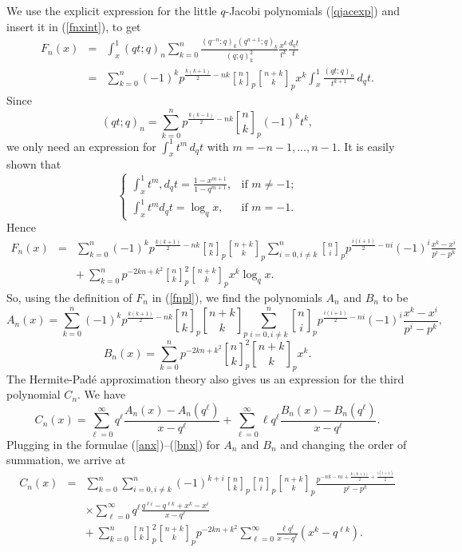 \documentclass[12pt]{article}
\def \qbinom#1#2{\genfrac{[}{]}{0pt}{}{#1}{#2}}
\numberwithin{equation}{section}
\begin{document}
We use the explicit expression for the little $q$-Jacobi
polynomials (\ref{qjacexp}) and insert it in (\ref{fnxint}), to
get
\begin{eqnarray}
 \nonumber F_n(x) &=& \int_x^1(qt;q)_n
  \sum_{k=0}^n\frac{(q^{-n};q)_k(q^{n+1};q)_k}{(q;q)_k^2}\frac{x^k}{t^k}\frac{d_{q}t}{t} \\
  \nonumber &=& \sum_{k=0}^n (-1)^kp^{\frac{k(k+1)}{2}-nk}
  \qbinom{n}{k}_{p}\qbinom{n+k}{k}_{p} x^k \int_x^1  \frac{(qt;q)_n}{t^{k+1}}\,d_{q}t.
\end{eqnarray}
Since
\[ (qt;q)_n=\sum_{k=0}^np^{\frac{k(k-1)}{2}-nk}\qbinom{n}{k}_{p}(-1)^k t^k,\]
we only need an expression for
$\int_x^1t^m\, d_{q}t$ with $m=-n-1,...,n-1$.
It is easily shown that
\[  \begin{cases}
   \displaystyle \int_x^1t^m,d_qt=\frac{1-x^{m+1}}{1-q^{m+1}}, & \textrm{if $m\neq-1$;} \\[12pt]
  \displaystyle  \int_x^1t^md_qt=\log_qx, & \textrm{if $m=-1$.}
\end{cases}
\]
Hence
\begin{eqnarray*}
    F_n(x)&=&\sum_{k=0}^n(-1)^kp^{\frac{k(k+1)}{2}-nk}\qbinom{n}{k}_{p}\qbinom{n+k}{k}_{p}
 \sum_{i=0,i\neq k}^n \qbinom{n}{i}_{p}p^{\frac{i(i+1)}{2}-ni}(-1)^i\frac{x^k-x^i}{p^i-p^k} \\
    & &+\ \sum_{k=0}^np^{-2kn+k^2} \qbinom{n}{k}_{p}^2 \qbinom{n+k}{k}_{p}x^k\log_{q}x.
\end{eqnarray*}
So, using the definition of $F_n$ in (\ref{fnpl}), we find the
polynomials $A_n$ and $B_n$ to be
\begin{equation}\label{anx}
A_n(x)=\sum_{k=0}^n(-1)^kp^{\frac{k(k+1)}{2}-nk}\qbinom{n}{k}_{p}\qbinom{n+k}{k}_{p}
 \sum_{i=0,i\neq k}^n \qbinom{n}{i}_{p}p^{\frac{i(i+1)}{2}-ni}(-1)^i\frac{x^k-x^i}{p^i-p^k},
\end{equation}
\begin{equation}\label{bnx}
B_n(x)=\sum_{k=0}^np^{-2kn+k^2}\qbinom{n}{k}_{p}^2 \qbinom{n+k}{k}_{p}x^k.
\end{equation}
The Hermite-Pad\'{e} approximation theory also gives us an
expression for the third polynomial $C_n$.  We have
\begin{equation}\label{cnpn2}
C_n(x)=\sum_{\ell=0}^\infty q^\ell\frac{A_n(x)-A_n(q^\ell)}{x-q^\ell}
+\sum_{\ell=0}^\infty \ell q^\ell\frac{B_n(x)-B_n(q^\ell)}{x-q^\ell}.
\end{equation}
Plugging in the formulae (\ref{anx})--(\ref{bnx}) for $A_n$ and $B_n$  and changing the order of summation,
we arrive at
\begin{eqnarray}
\nonumber C_n(x)&=&\sum_{k=0}^n\sum_{i=0,i\neq k}^n(-1)^{k+i}
\qbinom{n}{k}_{p}\qbinom{n}{i}_{p} \qbinom{n+k}{k}_{p} \frac{p^{-nk-ni+\frac{k(k+1)}{2}+\frac{i(i+1)}{2}}}{p^i-p^k} \\
\nonumber & &\times \sum_{\ell=0}^\infty q^\ell\frac{q^{\ell i}-q^{\ell k}+x^{k}-x^{i}}{x-q^\ell} \\
\nonumber & &+\ \sum_{k=0}^n\qbinom{n}{k}_{p}^2 \qbinom{n+k}{k}_{p}p^{-2kn+k^2}
 \sum_{\ell=0}^\infty\frac{\ell q^\ell}{x-q^\ell}\left(x^{k}-q^{\ell k}\right).
\end{eqnarray}
\end{document}
